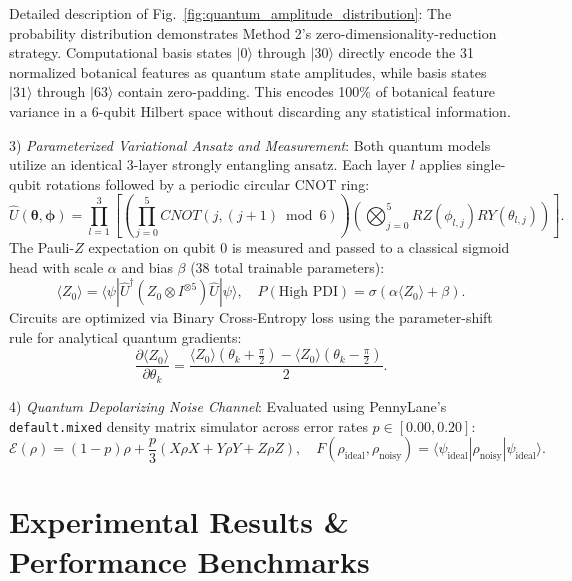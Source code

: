 \documentclass{ieeeaccess}
\begin{document}
Detailed description of Fig.~\ref{fig:quantum_amplitude_distribution}: The probability distribution demonstrates Method 2's zero-dimensionality-reduction strategy. Computational basis states $|0\rangle$ through $|30\rangle$ directly encode the 31 normalized botanical features as quantum state amplitudes, while basis states $|31\rangle$ through $|63\rangle$ contain zero-padding. This encodes 100\% of botanical feature variance in a 6-qubit Hilbert space without discarding any statistical information.

3) \textit{Parameterized Variational Ansatz and Measurement}: Both quantum models utilize an identical 3-layer strongly entangling ansatz. Each layer $l$ applies single-qubit rotations followed by a periodic circular CNOT ring:
\begin{equation}
\hat{U}(\boldsymbol{\theta}, \boldsymbol{\phi}) = \prod_{l=1}^3 \left[ \left(\prod_{j=0}^5 CNOT(j, (j+1)\bmod 6)\right) \left(\bigotimes_{j=0}^5 RZ(\phi_{l,j}) RY(\theta_{l,j})\right) \right].
\label{eq:ansatz}
\end{equation}
The Pauli-$Z$ expectation on qubit 0 is measured and passed to a classical sigmoid head with scale $\alpha$ and bias $\beta$ (38 total trainable parameters):
\begin{equation}
\langle Z_0 \rangle = \langle \psi | \hat{U}^\dagger (Z_0 \otimes I^{\otimes 5}) \hat{U} | \psi \rangle, \quad P(\text{High PDI}) = \sigma(\alpha \langle Z_0 \rangle + \beta).
\label{eq:measurement}
\end{equation}
Circuits are optimized via Binary Cross-Entropy loss using the parameter-shift rule for analytical quantum gradients:
\begin{equation}
\frac{\partial \langle Z_0 \rangle}{\partial \theta_k} = \frac{\langle Z_0 \rangle(\theta_k + \frac{\pi}{2}) - \langle Z_0 \rangle(\theta_k - \frac{\pi}{2})}{2}.
\label{eq:param_shift}
\end{equation}

4) \textit{Quantum Depolarizing Noise Channel}: Evaluated using PennyLane's \texttt{default.mixed} density matrix simulator across error rates $p \in [0.00, 0.20]$:
\begin{equation}
\mathcal{E}(\rho) = (1 - p)\rho + \frac{p}{3}(X\rho X + Y\rho Y + Z\rho Z), \quad F(\rho_{\text{ideal}}, \rho_{\text{noisy}}) = \langle \psi_{\text{ideal}} | \rho_{\text{noisy}} | \psi_{\text{ideal}} \rangle.
\label{eq:depolarizing}
\end{equation}

\section{Experimental Results \& Performance Benchmarks}
\label{sec:results}
\end{document}
